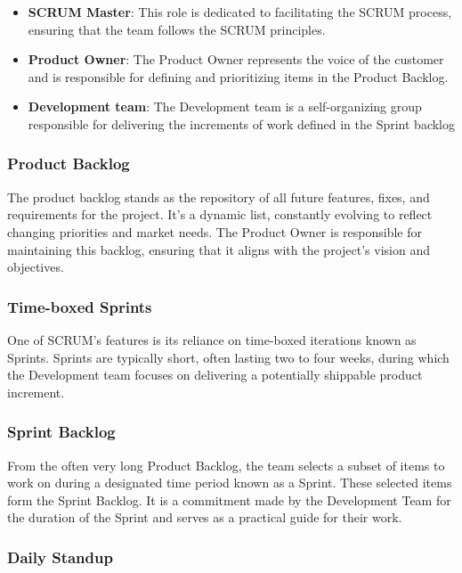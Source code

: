 \begin{itemize}
    \item \textbf{SCRUM Master}: This role is dedicated to facilitating the SCRUM process, 
        ensuring that the team follows the SCRUM principles.
    \item \textbf{Product Owner}: The Product Owner represents the voice of the 
        customer and is responsible for defining and prioritizing items in the Product Backlog.
    \item \textbf{Development team}: The Development team is a self-organizing 
        group responsible for delivering the increments of work defined in the Sprint backlog
\end{itemize}

\subsubsection*{Product Backlog}

The product backlog stands as the repository of all future features, 
fixes, and requirements for the project. 
It's a dynamic list, constantly evolving to reflect changing priorities and market needs. 
The Product Owner is responsible for maintaining this backlog, 
ensuring that it aligns with the project's vision and objectives.

\subsubsection*{Time-boxed Sprints}
One of SCRUM's features is its reliance on time-boxed iterations known as Sprints.
Sprints are typically short, often lasting two to four weeks, 
during which the Development team focuses on delivering a 
potentially shippable product increment.

\subsubsection*{Sprint Backlog}

From the often very long Product Backlog, the team selects a subset of items 
to work on during a designated time period known as a Sprint.
These selected items form the Sprint Backlog. 
It is a commitment made by the Development Team for the duration of 
the Sprint and serves as a practical guide for their work.

\subsubsection*{Daily Standup}


